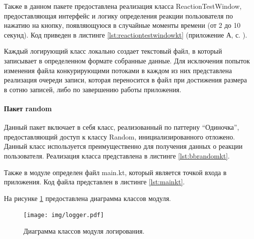 Также в данном пакете предоставлена реализация класса ReactionTestWindow, предоставляющая интерфейс и логику определения реакции пользователя по нажатию на кнопку, появляющуюся в случайные моменты времени (от 2 до 10 секунд). Код приведен в листинге \ref{lst:reactiontestwindowkt} (приложение А, с. \pageref{chp:application-a}).

Каждый логирующий класс локально создает текстовый файл, в который записывает в определенном формате собранные данные. Для исключения попыток изменения файла конкурирующими потоками в каждом из них представлена реализация очереди записи, которая переносится в файл при достижения размера в сотню записей, либо по завершению работы приложения.

\paragraph{Пакет random \newline}
Данный пакет включает в себя класс, реализованный по паттерну ``Одиночка'', предоставляющий доступ к классу Random, инициализированного отложено. Данный класс используется преимущественно для получения данных о реакции пользователя. Реализация класса представлена в листинге \ref{lst:bbrandomkt}.

Также в модуле определен файл main.kt, который является точкой входа в приложения. Код файла представлен в листинге \ref{lst:mainkt}.

На рисунке \ref{fig:loggingUml} предоставлена диаграмма классов модуля.
\begin{figure}[H]
	\centering
	\texttt{[image: img/logger.pdf]}
	\caption{Диаграмма классов модуля логирования.}
	\label{fig:loggingUml}
\end{figure}

